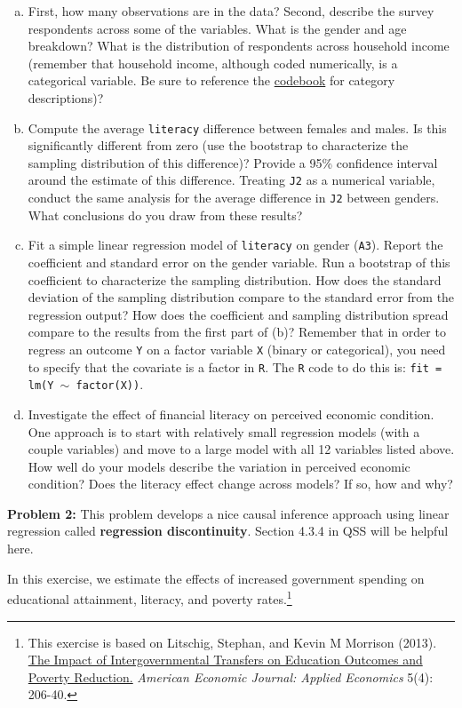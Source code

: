 \documentclass[11pt]{article}
\begin{document}
\begin{enumerate}[a.] 
\item First, how many observations are in the data? Second, describe the survey respondents across some of the variables.  What is the gender and age breakdown?  What is the distribution of respondents across household income (remember that household income, although coded numerically, is a categorical variable.  Be sure to reference the \href{google.com}{codebook} for category descriptions)?  
\item Compute the average {\tt literacy} difference between females and males.  Is this significantly different from zero (use the bootstrap to characterize the sampling distribution of this difference)?  Provide a 95\% confidence interval around the estimate of this difference.  Treating {\tt J2} as a numerical variable, conduct the same analysis for the average difference in {\tt J2} between genders.  What conclusions do you draw from these results?
\item Fit a simple linear regression model of {\tt literacy} on gender ({\tt A3}).  Report the coefficient and standard error on the gender variable.  Run a bootstrap of this coefficient to characterize the sampling distribution.  How does the standard deviation of the sampling distribution compare to the standard error from the regression output?  How does the coefficient and sampling distribution spread compare to the results from the first part of (b)?  Remember that in order to regress an outcome {\tt Y} on a factor variable {\tt X} (binary or categorical), you need to specify that the covariate is a factor in {\tt R}.  The {\tt R} code to do this is: {\tt fit = lm(Y $\sim$ factor(X))}.
\item Investigate the effect of financial literacy on perceived economic condition.  One approach is to start with relatively small regression models (with a couple variables) and move to a large model with all 12 variables listed above.  How well do your models describe the variation in perceived economic condition?  Does the literacy effect change across models?  If so, how and why?
\end{enumerate}

\vspace{7mm}
\noindent \textbf{Problem 2:} This problem develops a nice causal inference approach using linear regression called \textbf{regression discontinuity}.  Section 4.3.4 in QSS will be helpful here.   


In this exercise, we estimate the effects of increased government
spending on educational attainment, literacy, and poverty
rates.\footnote{This exercise is based on
Litschig, Stephan, and Kevin M Morrison (2013). \href{http://dx.doi.org/10.1257/app.5.4.206}{The Impact of Intergovernmental Transfers on Education Outcomes and Poverty Reduction.}\textit{ American Economic Journal: Applied Economics} 5(4): 206-40. }
\end{document}
